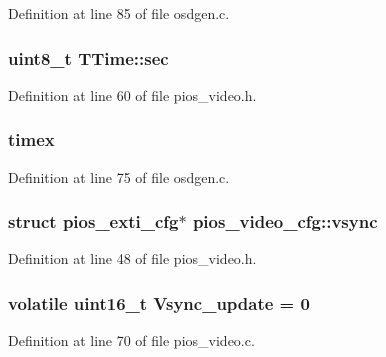 \-Definition at line 85 of file osdgen.\-c.

\hypertarget{group___p_i_o_s___v_i_d_e_o_gaa6288943af354a6cb143f2ad677cfece}{
\subsubsection[{sec}]{\setlength{\rightskip}{0pt plus 5cm}uint8\-\_\-t {\bf \-T\-Time\-::sec}}}\label{group___p_i_o_s___v_i_d_e_o_gaa6288943af354a6cb143f2ad677cfece}


\-Definition at line 60 of file pios\-\_\-video.\-h.

\hypertarget{group___p_i_o_s___v_i_d_e_o_gac6e460448d29f05aad59dc67c3035057}{
\subsubsection[{timex}]{ {\bf timex}}}\label{group___p_i_o_s___v_i_d_e_o_gac6e460448d29f05aad59dc67c3035057}


\-Definition at line 75 of file osdgen.\-c.

\hypertarget{group___p_i_o_s___v_i_d_e_o_ga489c20025b1facf5435c66ff616e1cd9}{
\subsubsection[{vsync}]{\setlength{\rightskip}{0pt plus 5cm}struct {\bf pios\-\_\-exti\-\_\-cfg}$\ast$ {\bf pios\-\_\-video\-\_\-cfg\-::vsync}}}\label{group___p_i_o_s___v_i_d_e_o_ga489c20025b1facf5435c66ff616e1cd9}


\-Definition at line 48 of file pios\-\_\-video.\-h.

\hypertarget{group___p_i_o_s___v_i_d_e_o_ga650b4db295bf40320fafbfce5954a39e}{
\subsubsection[{\-Vsync\-\_\-update}]{\setlength{\rightskip}{0pt plus 5cm}volatile uint16\-\_\-t {\bf \-Vsync\-\_\-update} = 0}}\label{group___p_i_o_s___v_i_d_e_o_ga650b4db295bf40320fafbfce5954a39e}


\-Definition at line 70 of file pios\-\_\-video.\-c.

